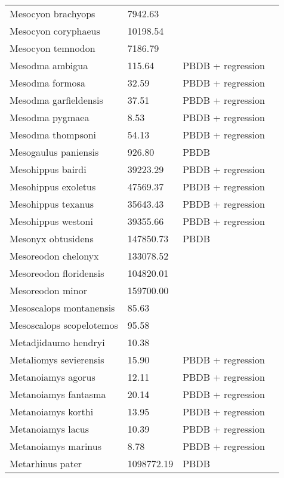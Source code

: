 \documentclass{article}
\begin{document}
\begin{center}
\begin{longtable}{p{} p{} p{} p{}}
    Mesocyon brachyops & 7942.63 & \cite{Tomiya2013} &  \\ 
    Mesocyon coryphaeus & 10198.54 & \cite{Tomiya2013} &  \\ 
    Mesocyon temnodon & 7186.79 & \cite{Tomiya2013} &  \\ 
    Mesodma ambigua & 115.64 & PBDB + regression &  \\ 
    Mesodma formosa & 32.59 & PBDB + regression &  \\ 
    Mesodma garfieldensis & 37.51 & PBDB + regression &  \\ 
    Mesodma pygmaea & 8.53 & PBDB + regression &  \\ 
    Mesodma thompsoni & 54.13 & PBDB + regression &  \\ 
    Mesogaulus paniensis & 926.80 & PBDB &  \\ 
    Mesohippus bairdi & 39223.29 & PBDB + regression &  \\ 
    Mesohippus exoletus & 47569.37 & PBDB + regression &  \\ 
    Mesohippus texanus & 35643.43 & PBDB + regression &  \\ 
    Mesohippus westoni & 39355.66 & PBDB + regression &  \\ 
    Mesonyx obtusidens & 147850.73 & PBDB &  \\ 
    Mesoreodon chelonyx & 133078.52 & \cite{Bever2003} &  \\ 
    Mesoreodon floridensis & 104820.01 & \cite{Tomiya2013} &  \\ 
    Mesoreodon minor & 159700.00 & \cite{McKenna2011} &  \\ 
    Mesoscalops montanensis & 85.63 & \cite{Tomiya2013} &  \\ 
    Mesoscalops scopelotemos & 95.58 & \cite{Tomiya2013} &  \\ 
    Metadjidaumo hendryi & 10.38 & \cite{Tomiya2013} &  \\ 
    Metaliomys sevierensis & 15.90 & PBDB + regression &  \\ 
    Metanoiamys agorus & 12.11 & PBDB + regression &  \\ 
    Metanoiamys fantasma & 20.14 & PBDB + regression &  \\ 
    Metanoiamys korthi & 13.95 & PBDB + regression &  \\ 
    Metanoiamys lacus & 10.39 & PBDB + regression &  \\ 
    Metanoiamys marinus & 8.78 & PBDB + regression &  \\ 
    Metarhinus pater & 1098772.19 & PBDB &  \\ 

\end{longtable}
\end{center}
\end{document}
